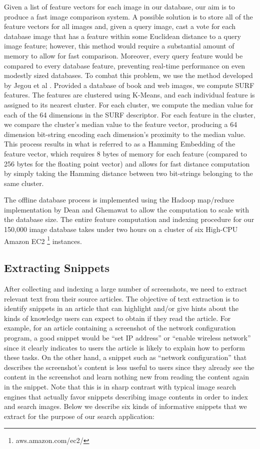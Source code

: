 \documentclass{www2010-submission}
\begin{document}
Given a list of feature vectors for each image in our database, our
aim is to produce a fast image comparison system.  A possible solution
is to store all of the feature vectors for all images and, given a
query image, cast a vote for each database image that has a feature
within some Euclidean distance to a query image feature; however, this
method would require a substantial amount of memory to allow for fast
comparison.  Moreover, every query feature would be compared to every
database feature, preventing real-time performance on even modestly
sized databases.  To combat this problem, we use the method developed
by Jegou et al \cite{Schmid1478419}.  Provided a database of book and web images,
we compute SURF features. The features are clustered using K-Means,
and each individual feature is assigned to its nearest cluster.  For
each cluster, we compute the median value for each of the 64
dimensions in the SURF descriptor.  For each feature in the cluster,
we compare the cluster's median value to the feature vector, producing
a 64 dimension bit-string encoding each dimension's proximity to the
median value.  This process results in what is referred to as a
Hamming Embedding of the feature vector, which requires 8 bytes of
memory for each feature (compared to 256 bytes for the floating point
vector) and allows for fast distance computation by simply taking the
Hamming distance between two bit-strings belonging to the same
cluster.

The offline database process is implemented using the Hadoop
map/reduce implementation by Dean and Ghemawat \cite{Ghemaqat1327492} to allow the
computation to scale with the database size.  The entire feature
computation and indexing procedure for our 150,000 image database
takes under two hours on a cluster of six High-CPU Amazon EC2 \footnote{aws.amazon.com/ec2/}
instances.
\vspace{0.2in}
\subsection{Extracting Snippets}
\label{sec:extracting_snippets}

After collecting and indexing a large number of screenshots, we need
to extract relevant text from their source articles. The objective of
text extraction is to identify snippets in an article that can
highlight and/or give hints about the kinds of knowledge users can
expect to obtain if they read the article. For example, for an article
containing a screenshot of the network configuration program, a good
snippet would be ``set IP address'' or ``enable wireless network''
since it clearly indicates to users the article is likely to explain
how to perform these tasks. On the other hand, a snippet such as
``network configuration'' that describes the screenshot's content is
less useful to users since they already see the content in the
screenshot and learn nothing new from reading the content again in the
snippet. Note that this is in sharp contrast with typical image search
engines that actually favor snippets describing image contents in
order to index and search images. Below we describe six kinds of
informative snippets that we extract for the purpose of our search
application:
\end{document}
